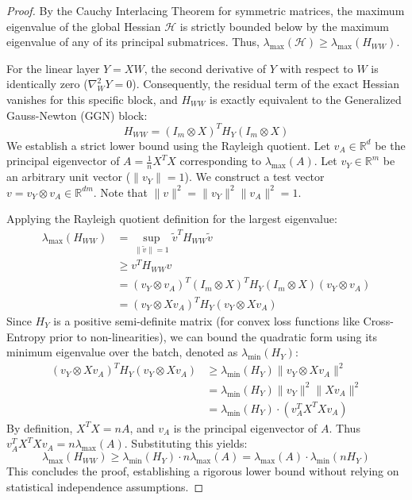 \documentclass[11pt, a4paper]{article}
\begin{document}
\begin{proof}
By the Cauchy Interlacing Theorem for symmetric matrices, the maximum eigenvalue of the global Hessian $\mathcal{H}$ is strictly bounded below by the maximum eigenvalue of any of its principal submatrices. Thus, $\lambda_{\max}(\mathcal{H}) \ge \lambda_{\max}(H_{WW})$.

For the linear layer $Y = XW$, the second derivative of $Y$ with respect to $W$ is identically zero ($\nabla_W^2 Y = 0$). Consequently, the residual term of the exact Hessian vanishes for this specific block, and $H_{WW}$ is exactly equivalent to the Generalized Gauss-Newton (GGN) block:
\begin{equation}
    H_{WW} = (I_m \otimes X)^T H_Y (I_m \otimes X)
\end{equation}
We establish a strict lower bound using the Rayleigh quotient. Let $v_A \in \mathbb{R}^d$ be the principal eigenvector of $A = \frac{1}{n} X^T X$ corresponding to $\lambda_{\max}(A)$. Let $v_Y \in \mathbb{R}^m$ be an arbitrary unit vector ($\|v_Y\| = 1$). We construct a test vector $v = v_Y \otimes v_A \in \mathbb{R}^{dm}$. Note that $\|v\|^2 = \|v_Y\|^2 \|v_A\|^2 = 1$.

Applying the Rayleigh quotient definition for the largest eigenvalue:
\begin{align}
    \lambda_{\max}(H_{WW}) &= \sup_{\|\tilde{v}\|=1} \tilde{v}^T H_{WW} \tilde{v} \\
    &\ge v^T H_{WW} v \\
    &= (v_Y \otimes v_A)^T (I_m \otimes X)^T H_Y (I_m \otimes X) (v_Y \otimes v_A) \\
    &= (v_Y \otimes X v_A)^T H_Y (v_Y \otimes X v_A)
\end{align}
Since $H_Y$ is a positive semi-definite matrix (for convex loss functions like Cross-Entropy prior to non-linearities), we can bound the quadratic form using its minimum eigenvalue over the batch, denoted as $\lambda_{\min}(H_Y)$:
\begin{align}
    (v_Y \otimes X v_A)^T H_Y (v_Y \otimes X v_A) &\ge \lambda_{\min}(H_Y) \|v_Y \otimes X v_A\|^2 \\
    &= \lambda_{\min}(H_Y) \|v_Y\|^2 \|X v_A\|^2 \\
    &= \lambda_{\min}(H_Y) \cdot (v_A^T X^T X v_A)
\end{align}
By definition, $X^T X = n A$, and $v_A$ is the principal eigenvector of $A$. Thus $v_A^T X^T X v_A = n \lambda_{\max}(A)$. Substituting this yields:
\begin{equation}
    \lambda_{\max}(H_{WW}) \ge \lambda_{\min}(H_Y) \cdot n \lambda_{\max}(A) = \lambda_{\max}(A) \cdot \lambda_{\min}(n H_Y)
\end{equation}
This concludes the proof, establishing a rigorous lower bound without relying on statistical independence assumptions.
\end{proof}
\end{document}
